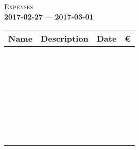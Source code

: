 \documentclass[12pt]{article}
\begin{document}

\begin{center}
  \large
  \textsc{Expenses}\\
  \small
  \textbf{2017-02-27} --- \textbf{2017-03-01}\\[0.5cm]

  \small
  \begin{tabular}{|K{4.0cm}|K{7.5cm}|K{2.5cm}|K{1.5cm}|}
    \hline
    \textbf{Name} & \textbf{Description} & \textbf{Date} & \euro \\ \hline
    \hline
    & & & \\[0.25cm] \hline
    & & & \\[0.25cm] \hline
    & & & \\[0.25cm] \hline
    & & & \\[0.25cm] \hline
    & & & \\[0.25cm] \hline
    & & & \\[0.25cm] \hline
    & & & \\[0.25cm] \hline
    & & & \\[0.25cm] \hline
    & & & \\[0.25cm] \hline
    & & & \\[0.25cm] \hline
    & & & \\[0.25cm] \hline
    & & & \\[0.25cm] \hline
    & & & \\[0.25cm] \hline
    & & & \\[0.25cm] \hline
    & & & \\[0.25cm] \hline
    & & & \\[0.25cm] \hline
    & & & \\[0.25cm] \hline
    & & & \\[0.25cm] \hline
    & & & \\[0.25cm] \hline
    & & & \\[0.25cm] \hline
    & & & \\[0.25cm] \hline
    & & & \\[0.25cm] \hline
    & & & \\[0.25cm] \hline
    & & & \\[0.25cm] \hline
    & & & \\[0.25cm] \hline
    & & & \\[0.25cm] \hline
    & & & \\[0.25cm] \hline
    & & & \\[0.25cm] \hline
    & & & \\[0.25cm] \hline
    & & & \\[0.25cm] \hline
    & & & \\[0.25cm] \hline
    & & & \\[0.25cm] \hline
  \end{tabular}
\end{center}
\end{document}
